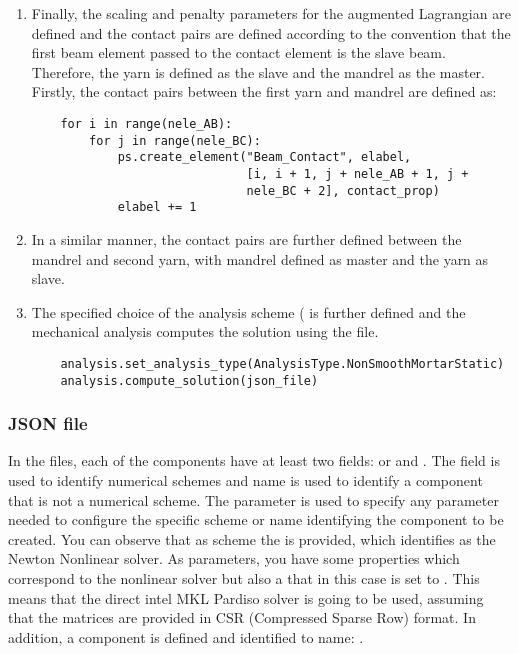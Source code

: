 \begin{enumerate}
    \item Finally, the scaling and penalty parameters for the augmented Lagrangian are defined and the contact pairs are defined according to the convention that the first beam element passed to the contact element is the slave beam. Therefore, the yarn is defined as the slave and the mandrel as the master. Firstly, the contact pairs between the first yarn  and mandrel  are defined as:
    \pythonstyle
    \begin{tcolorbox}\begin{lstlisting}
    for i in range(nele_AB):
        for j in range(nele_BC):
            ps.create_element("Beam_Contact", elabel,
                              [i, i + 1, j + nele_AB + 1, j +
                              nele_BC + 2], contact_prop)
            elabel += 1
    \end{lstlisting}\end{tcolorbox}
    \item In a similar manner, the contact pairs are further defined between the mandrel and second yarn, with mandrel defined as master and the yarn as slave.
    \item The specified choice of the analysis scheme ( is further defined and the mechanical analysis computes the solution using the  file.
    \pythonstyle
    \begin{tcolorbox}\begin{lstlisting}
    analysis.set_analysis_type(AnalysisType.NonSmoothMortarStatic)
    analysis.compute_solution(json_file)
    \end{lstlisting}\end{tcolorbox}    
\end{enumerate}

\subsubsection{JSON file}
In the  files, each of the components have at least two fields:  or  and . The field  is used to identify numerical schemes and name is used to identify a component that is not a numerical scheme. The  parameter is used to specify any parameter needed to configure the specific scheme or name identifying the component to be created. You can observe that as scheme the  is provided, which identifies as the Newton Nonlinear solver. As parameters, you have some properties which correspond to the nonlinear solver but also a  that in this case is set to . This means that the direct intel MKL Pardiso solver is going to be used, assuming that the matrices are provided in CSR (Compressed Sparse Row) format. In addition, a component  is defined and identified to name: .

